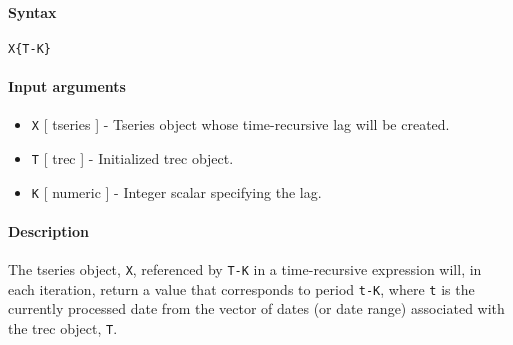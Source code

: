 


	\paragraph{Syntax}

\begin{verbatim}
X{T-K}
\end{verbatim}

\paragraph{Input arguments}

\begin{itemize}
\item
  \texttt{X} {[} tseries {]} - Tseries object whose time-recursive lag
  will be created.
\item
  \texttt{T} {[} trec {]} - Initialized trec object.
\item
  \texttt{K} {[} numeric {]} - Integer scalar specifying the lag.
\end{itemize}

\paragraph{Description}

The tseries object, \texttt{X}, referenced by \texttt{T-K} in a
time-recursive expression will, in each iteration, return a value that
corresponds to period \texttt{t-K}, where \texttt{t} is the currently
processed date from the vector of dates (or date range) associated with
the trec object, \texttt{T}.


